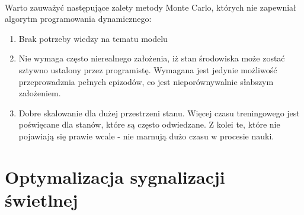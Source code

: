 \documentclass[12pt]{book}
\theoremstyle{plain}
\begin{document}
\\ Warto zauważyć następujące zalety metody Monte Carlo, których nie zapewniał algorytm programowania dynamicznego:
\begin{enumerate}
	\item Brak potrzeby wiedzy na tematu modelu
	\item Nie wymaga często nierealnego założenia, iż stan środowiska może zostać sztywno ustalony przez programistę. Wymagana jest jedynie możliwość przeprowadznia pełnych epizodów, co jest nieporównywalnie słabszym założeniem.
	\item Dobre skalowanie dla dużej przestrzeni stanu. Więcej czasu treningowego jest poświęcane dla stanów, które są często odwiedzane. Z kolei te, które nie pojawiają się prawie wcale - nie marnują dużo czasu w procesie nauki.
\end{enumerate}

\chapter{Optymalizacja sygnalizacji świetlnej}

\end{document}
